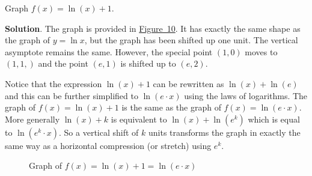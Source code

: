 \documentclass[10pt,]{book}
\theoremstyle{ptxdefinitionnotitle}
\theoremstyle{ptxdefinitiontitle}
\theoremstyle{ptxdefinitionnotitle}
\theoremstyle{ptxdefinitiontitle}
\theoremstyle{ptxdefinitionnotitle}
\theoremstyle{ptxdefinitiontitle}
\numberwithin{equation}{section}
\begin{document}
\begin{example}\label{example-26}
\hypertarget{p-348}{}%
Graph \(f(x) = \ln (x) +1 \).%
\par\smallskip%
\noindent\textbf{Solution}.\hypertarget{solution-26}{}\quad%
\hypertarget{p-349}{}%
The graph is provided in \hyperref[natural-log-plus-one]{Figure~10}. It has exactly the same shape as the graph of \(y = \ln x\), but the graph has been shifted up one unit. The vertical asymptote remains the same. However, the special point \(\left( 1,0 \right)\) moves to \(\left( 1,1, \right)\) and the point \(\left( e, 1 \right)\) is shifted up to \(\left( e, 2 \right)\).%
\par
\hypertarget{p-350}{}%
Notice that the expression \(\ln (x) + 1\) can be rewritten as \(\ln (x) + \ln (e)\) and this can be further simplified to \(\ln \left( e \cdot x \right)\) using the laws of logarithms. The graph of \(f(x) = \ln (x) + 1\) is the same as the graph of \(f(x) = \ln \left( e \cdot x \right)\).  More generally \(\ln (x) + k\) is equivalent to \(\ln (x) + \ln \left( e^k \right)\) which is equal to \(\ln \left( e^k \cdot x \right)\). So a vertical shift of \(k\) units transforms the graph in exactly the same way as a horizontal compression (or stretch) using \(e^k\).%
\begin{figure}
\centering
{
}
\caption{Graph of \(f(x) = \ln (x) +1 = \ln \left( e \cdot x \right)\)\label{natural-log-plus-one}}
\end{figure}
\end{example}
\end{document}
